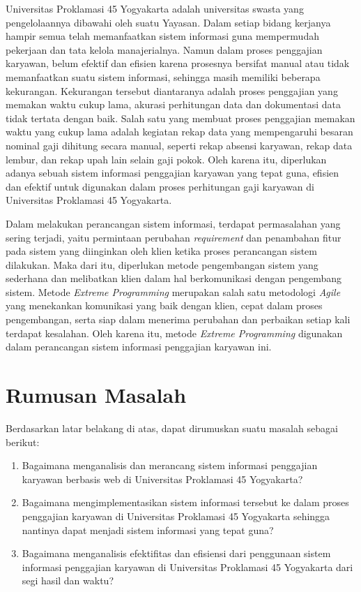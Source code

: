 Universitas Proklamasi 45 Yogyakarta adalah universitas swasta yang pengelolaannya dibawahi oleh suatu Yayasan. Dalam setiap bidang kerjanya hampir semua telah memanfaatkan sistem informasi guna mempermudah pekerjaan dan tata kelola manajerialnya. Namun dalam proses penggajian karyawan, belum efektif dan efisien karena prosesnya bersifat manual atau tidak memanfaatkan suatu sistem informasi, sehingga masih memiliki beberapa kekurangan. Kekurangan tersebut diantaranya adalah proses penggajian yang memakan waktu cukup lama, akurasi perhitungan data dan dokumentasi data tidak tertata dengan baik. Salah satu yang membuat proses penggajian memakan waktu yang cukup lama adalah kegiatan rekap data yang mempengaruhi besaran nominal gaji dihitung secara manual, seperti rekap absensi karyawan, rekap data lembur, dan rekap upah lain selain gaji pokok.  Oleh karena itu, diperlukan adanya sebuah sistem informasi penggajian karyawan yang tepat guna, efisien dan efektif untuk digunakan dalam proses perhitungan gaji karyawan di Universitas Proklamasi 45 Yogyakarta.

Dalam melakukan perancangan sistem informasi, terdapat permasalahan yang sering terjadi, yaitu permintaan perubahan \emph{requirement} dan penambahan fitur pada sistem yang diinginkan oleh klien ketika proses perancangan sistem dilakukan. Maka dari itu, diperlukan metode pengembangan sistem yang sederhana dan melibatkan klien dalam hal berkomunikasi dengan pengembang sistem. Metode \emph{Extreme Programming} merupakan salah satu metodologi \emph{Agile} yang menekankan komunikasi yang baik dengan klien, cepat dalam proses pengembangan, serta siap dalam menerima perubahan dan perbaikan setiap kali terdapat kesalahan. Oleh karena itu, metode \emph{Extreme Programming} digunakan dalam perancangan sistem informasi penggajian karyawan ini.

\section{Rumusan Masalah}
Berdasarkan latar belakang di atas, dapat dirumuskan suatu masalah sebagai berikut:
\begin{enumerate}
\itemsep0em
\item Bagaimana menganalisis dan merancang sistem informasi penggajian karyawan berbasis web di Universitas Proklamasi 45 Yogyakarta?
\item Bagaimana mengimplementasikan sistem informasi tersebut ke dalam proses penggajian karyawan di Universitas Proklamasi 45 Yogyakarta sehingga nantinya dapat menjadi sistem informasi yang tepat guna?
\item Bagaimana menganalisis efektifitas dan efisiensi dari penggunaan sistem informasi penggajian karyawan di Universitas Proklamasi 45 Yogyakarta dari segi hasil dan waktu?
\end{enumerate}

